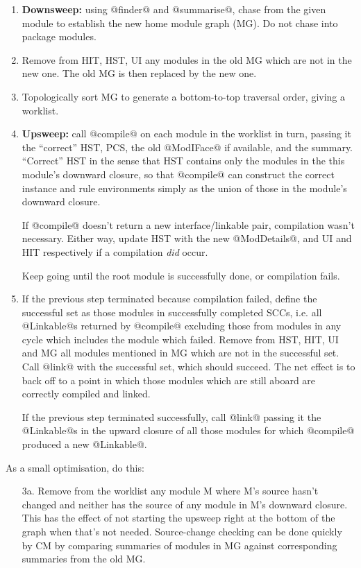 \documentclass[11pt]{article}
\begin{document}
\begin{enumerate}
\item {\bf Downsweep:} using @finder@ and @summarise@, chase from 
      the given module to
      establish the new home module graph (MG).  Do not chase into
      package modules.
\item Remove from HIT, HST, UI any modules in the old MG which are
      not in the new one.  The old MG is then replaced by the new one.
\item Topologically sort MG to generate a bottom-to-top traversal
      order, giving a worklist.
\item {\bf Upsweep:} call @compile@ on each module in the worklist in 
      turn, passing it
      the ``correct'' HST, PCS, the old @ModIFace@ if
      available, and the summary.  ``Correct'' HST in the sense that
      HST contains only the modules in the this module's downward
      closure, so that @compile@ can construct the correct instance
      and rule environments simply as the union of those in 
      the module's downward closure.

      If @compile@ doesn't return a new interface/linkable pair,
      compilation wasn't necessary.  Either way, update HST with
      the new @ModDetails@, and UI and HIT respectively if a 
      compilation {\em did} occur.

      Keep going until the root module is successfully done, or
      compilation fails.
      
\item If the previous step terminated because compilation failed,
      define the successful set as those modules in successfully
      completed SCCs, i.e. all @Linkable@s returned by @compile@ excluding
      those from modules in any cycle which includes the module which failed.
      Remove from HST, HIT, UI and MG all modules mentioned in MG which 
      are not in the successful set.  Call @link@ with the successful
      set,
      which should succeed.  The net effect is to back off to a point
      in which those modules which are still aboard are correctly
      compiled and linked.

      If the previous step terminated successfully, 
      call @link@ passing it the @Linkable@s in the upward closure of
      all those modules for which @compile@ produced a new @Linkable@.
\end{enumerate}
As a small optimisation, do this:
\begin{enumerate}
\item[3a.] Remove from the worklist any module M where M's source
     hasn't changed and neither has the source of any module in M's
     downward closure.  This has the effect of not starting the upsweep
     right at the bottom of the graph when that's not needed.
     Source-change checking can be done quickly by CM by comparing
     summaries of modules in MG against corresponding 
     summaries from the old MG.
\end{enumerate}
\end{document}
